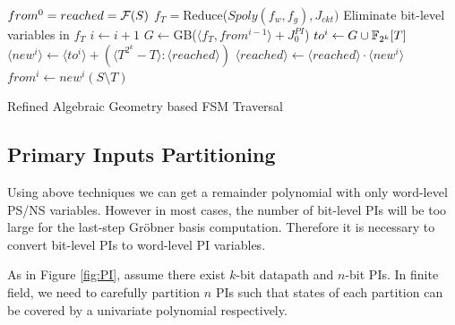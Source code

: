 \begin{algorithm}[hbt]
\SetAlgoNoLine
\LinesNumbered

  $from^0 = reached = {\mathcal{F}}(S)$\;
  $f_T = $Reduce($Spoly(f_w,f_g), J_{ckt})$\;
	Eliminate bit-level variables in $f_T$\;
  {
  	$i \gets i + 1$\;
  	$G \gets$GB($\langle f_T , from^{i-1}\rangle+J_0^{PI}$)\;
	$to^i \gets G\cup {\mathbb{F}}_{2^k}[T]$\;
	$\langle new^i\rangle \gets \langle to^i\rangle + (\langle T^{2^k}-T\rangle:\langle reached\rangle)$\;
  	$\langle reached\rangle \gets \langle reached\rangle \cdot \langle new^i\rangle$\;
	$from^i \gets new^i(S\setminus T)$\;
  }
\caption {Refined Algebraic Geometry based FSM Traversal}\label{alg:refined}
\end{algorithm}

\subsection{Primary Inputs Partitioning}
Using above techniques we can get a remainder polynomial with only word-level PS/NS variables. However in most 
cases, the number of bit-level PIs will be too large for the last-step Gr\"obner basis computation. 
Therefore it is necessary to convert bit-level PIs to word-level PI variables. 

As in Figure \ref{fig:PI}, assume there exist $k$-bit datapath and $n$-bit PIs. In finite field, we need to carefully partition $n$ PIs
such that states of each partition can be covered by a univariate polynomial respectively.


